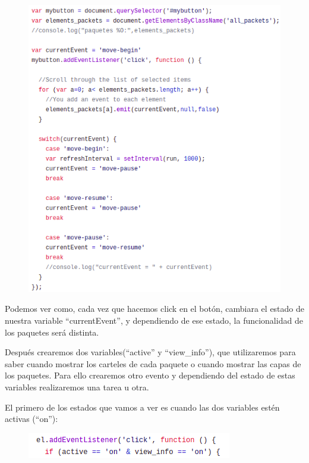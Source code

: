\documentclass[a4paper, 12pt]{book}
\begin{document}
\begin{figure}[h]
\centering
    \includegraphics[scale=0.7]{img/currevnt_comp_pack.png}
\end{figure}

\newpage
Podemos ver como, cada vez que hacemos click en el botón, cambiara el estado de nuestra variable “currentEvent”, y dependiendo de ese estado, la funcionalidad de los paquetes será distinta.

Después crearemos dos variables(“active” y “view\_info”), que utilizaremos para saber cuando mostrar los carteles de cada paquete o cuando mostrar las capas de los paquetes. Para ello crearemos otro evento y dependiendo del estado de estas variables realizaremos una tarea u otra.

El primero de los estados que vamos a ver es cuando las dos variables estén activas (“on”):

\begin{figure}[h]
\centering
    \includegraphics[scale=0.7]{img/eventlist1_comp_pack.png}
\end{figure}
\end{document}
